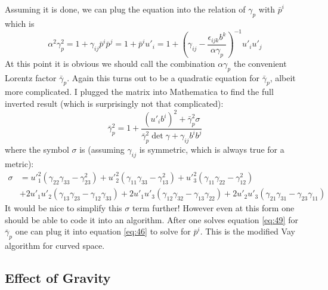 Assuming it is done, we can plug the equation into the relation of $\gamma_p$
with $\bar{p}^i$ which is
\begin{equation}
  \label{eq:48}
  \alpha^2\gamma_p^2 = 1 + \gamma_{ij}\bar{p}^i\bar{p}^j = 1 + \bar{p}^iu'_i = 1 + \left( \gamma_{ij} - \frac{\epsilon_{ijk}b^k}{\alpha\gamma_p} \right)^{-1}u'_iu'_j
\end{equation}
At this point it is obvious we should call the combination $\alpha\gamma_p$
the convenient Lorentz factor $\bar{\gamma}_p$. Again this turns out to be a
quadratic equation for $\bar{\gamma}_p$, albeit more complicated. I plugged the
matrix into Mathematica to find the full inverted result (which is surprisingly
not that complicated):
\begin{equation}
  \label{eq:49}
  \bar{\gamma}_p^2 = 1 + \frac{(u'_ib^i)^2 + \bar{\gamma}_p^2\sigma}{\bar{\gamma}_p^2\det \gamma + \gamma_{ij}b^ib^j}
\end{equation}
where the symbol $\sigma$ is (assuming $\gamma_{ij}$ is symmetric, which is
always true for a metric):
\begin{equation}
  \label{eq:50}
\begin{split}
  \sigma &= u'^2_{1}(\gamma_{22}\gamma_{33} - \gamma_{23}^2) + u'^2_2(\gamma_{11}\gamma_{33}-\gamma_{13}^2) + u'^2_3(\gamma_{11}\gamma_{22} - \gamma_{12}^2) \\
& + 2u'_1u'_2(\gamma_{13}\gamma_{23} - \gamma_{12}\gamma_{33}) + 2u'_1u'_3(\gamma_{12}\gamma_{32} - \gamma_{13}\gamma_{22}) + 2u'_2u'_3(\gamma_{21}\gamma_{31} - \gamma_{23}\gamma_{11})
\end{split}
\end{equation}
It would be nice to simplify this $\sigma$ term further! However even at this
form one should be able to code it into an algorithm. After one solves equation
\eqref{eq:49} for $\bar{\gamma}_p$ one can plug it into equation \eqref{eq:46}
to solve for $\bar{p}^i$. This is the modified Vay algorithm for curved space.

\subsection{Effect of Gravity}
\label{sec:gravity}

